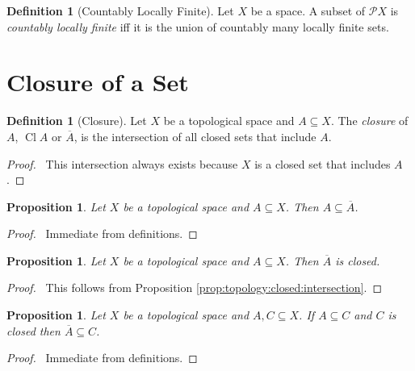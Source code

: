 \documentclass{report}
\let\qed\relax
\newtheorem{prop}[lm]{Proposition}
\theoremstyle{definition}
\newtheorem{df}[lm]{Definition}
\newcommand{\Cl}{\ensuremath{\operatorname{Cl}}}
\begin{document}
  \begin{df}[Countably Locally Finite]
    Let $X$ be a space. A subset of $\mathcal{P} X$ is \emph{countably locally finite} iff it is the union of countably many locally finite sets.
  \end{df}

  \section{Closure of a Set}

  \begin{df}[Closure]
    Let $X$ be a topological space and $A \subseteq X$. The \emph{closure} of
    $A$, $\Cl A$ or $\overline{A}$, is the intersection of all closed sets that
    include $A$.
  \end{df}

  \begin{proof}
    \pf\ This intersection always exists because $X$ is a closed set that
    includes $A$. \qed
  \end{proof}

  \begin{prop}
    \label{prop:topology:closure:A_sub_Abar}
    Let $X$ be a topological space and $A \subseteq X$. Then $A \subseteq
    \overline{A}$.
  \end{prop}

  \begin{proof}
    \pf\ Immediate from definitions. \qed
  \end{proof}

  \begin{prop}
    \label{prop:topology:closure:closed}
    Let $X$ be a topological space and $A \subseteq X$. Then $\overline{A}$ is
    closed.
  \end{prop}

  \begin{proof}
    \pf\ This follows from Proposition \ref{prop:topology:closed:intersection}.
    \qed
  \end{proof}

  \begin{prop}
    \label{prop:topology:closure:minimal}
    Let $X$ be a topological space and $A, C \subseteq X$. If $A \subseteq C$
    and $C$ is closed then $\overline{A} \subseteq C$.
  \end{prop}

  \begin{proof}
    \pf\ Immediate from definitions. \qed
  \end{proof}
\end{document}
